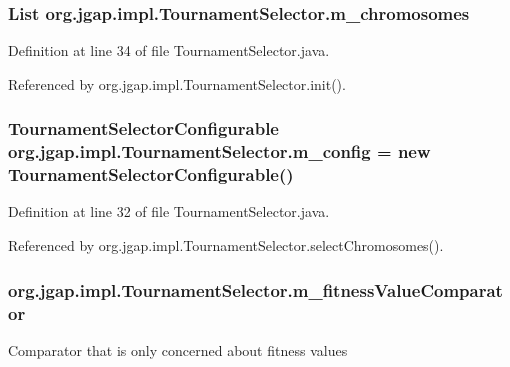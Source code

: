 \hypertarget{classorg_1_1jgap_1_1impl_1_1_tournament_selector_ad3c694c7809a5a14702d4d2dde7d246c}{
\subsubsection[{m\-\_\-chromosomes}]{\setlength{\rightskip}{0pt plus 5cm}List org.\-jgap.\-impl.\-Tournament\-Selector.\-m\-\_\-chromosomes\hspace{0.3cm}{\ttfamily [private]}}}\label{classorg_1_1jgap_1_1impl_1_1_tournament_selector_ad3c694c7809a5a14702d4d2dde7d246c}


Definition at line 34 of file Tournament\-Selector.\-java.



Referenced by org.\-jgap.\-impl.\-Tournament\-Selector.\-init().

\hypertarget{classorg_1_1jgap_1_1impl_1_1_tournament_selector_a5dbb6a9b366e82259aa1c87143be7961}{
\subsubsection[{m\-\_\-config}]{\setlength{\rightskip}{0pt plus 5cm}Tournament\-Selector\-Configurable org.\-jgap.\-impl.\-Tournament\-Selector.\-m\-\_\-config = new Tournament\-Selector\-Configurable()\hspace{0.3cm}{\ttfamily [private]}}}\label{classorg_1_1jgap_1_1impl_1_1_tournament_selector_a5dbb6a9b366e82259aa1c87143be7961}


Definition at line 32 of file Tournament\-Selector.\-java.



Referenced by org.\-jgap.\-impl.\-Tournament\-Selector.\-select\-Chromosomes().

\hypertarget{classorg_1_1jgap_1_1impl_1_1_tournament_selector_a3585804c6e7926efc37e9d4f52692f49}{
\subsubsection[{m\-\_\-fitness\-Value\-Comparator}]{ org.\-jgap.\-impl.\-Tournament\-Selector.\-m\-\_\-fitness\-Value\-Comparator\hspace{0.3cm}{\ttfamily [private]}}}\label{classorg_1_1jgap_1_1impl_1_1_tournament_selector_a3585804c6e7926efc37e9d4f52692f49}
Comparator that is only concerned about fitness values 


